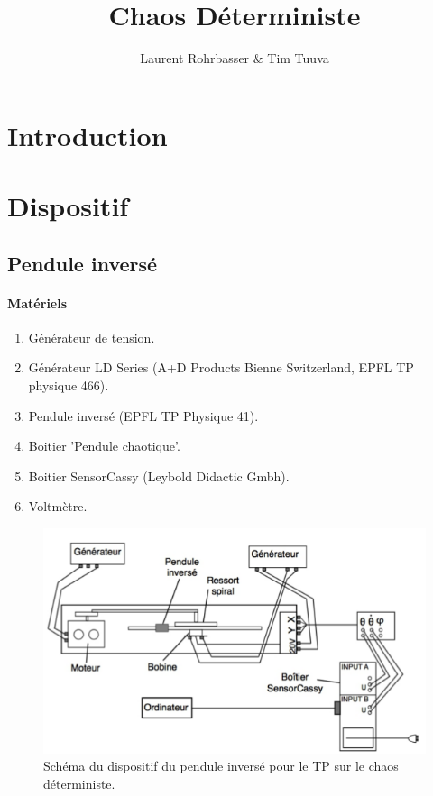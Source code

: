 \documentclass[a4paper,12pt,oneside]{article}
\begin{document}
\title{Chaos Déterministe}
\author{Laurent Rohrbasser \& Tim Tuuva}

\maketitle
\tableofcontents
\baselineskip=16pt
\parindent=15pt
\parskip=5pt

\begin{abstract}
\end{abstract}

\section{Introduction}

\newpage
\section{Dispositif}
\subsection{Pendule inversé}

\paragraph{Matériels}
\begin{enumerate}
	\item Générateur de tension.
	\item Générateur LD Series (A+D Products Bienne Switzerland, EPFL TP physique 466).
	\item Pendule inversé (EPFL TP Physique 41).
	\item Boitier ’Pendule chaotique’.
	\item Boitier SensorCassy (Leybold Didactic Gmbh).
	\item Voltmètre.
\end{enumerate}

\begin{figure}[h!]
  \begin{center}
  \includegraphics[width=0.5\linewidth,angle=0]{./figures/pendule_inverse.png}
  \caption{Schéma du dispositif du pendule inversé pour le TP sur le chaos déterministe.} \label{fig:pendule1}
  \end{center}
\end{figure}
\end{document}
